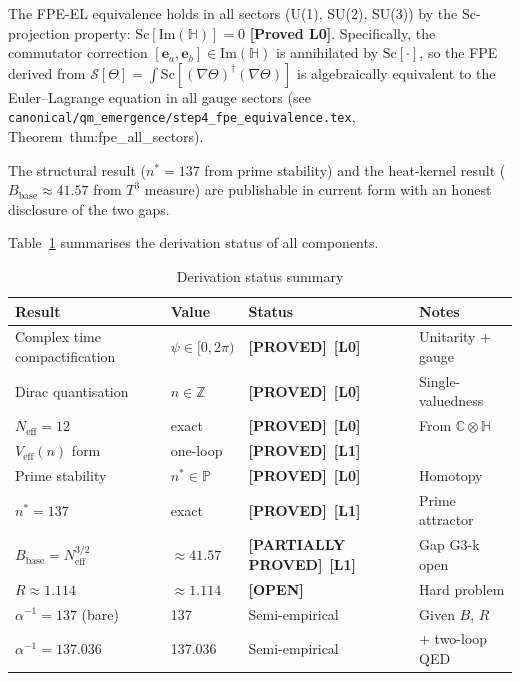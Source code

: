 \documentclass[11pt,a4paper]{article}
\theoremstyle{definition}
\theoremstyle{remark}
\newcommand{\Lzero}{\textbf{[L0]}}
\newcommand{\Lone}{\textbf{[L1]}}
\newcommand{\OPEN}{\textbf{[OPEN]}}
\newcommand{\PROVED}{\textbf{[PROVED]}}
\newcommand{\PARTIAL}{\textbf{[PARTIALLY PROVED]}}
\begin{document}
The FPE-EL equivalence holds in all sectors (U(1), SU(2), SU(3))
by the $\mathrm{Sc}$-projection property: $\mathrm{Sc}[\mathrm{Im}(\mathbb{H})] = 0$
\textbf{[Proved L0]}.  Specifically, the commutator correction
$[\mathbf{e}_a,\mathbf{e}_b] \in \mathrm{Im}(\mathbb{H})$ is annihilated by
$\mathrm{Sc}[\cdot]$, so the FPE derived from
$\mathcal{S}[\Theta] = \int\mathrm{Sc}[(\nabla\Theta)^\dagger(\nabla\Theta)]$
is algebraically equivalent to the Euler--Lagrange equation in all gauge sectors
(see \texttt{canonical/qm\_emergence/step4\_fpe\_equivalence.tex},
Theorem~thm:fpe\_all\_sectors).

The structural result ($n^* = 137$ from prime stability) and the heat-kernel
result ($B_{\mathrm{base}} \approx 41.57$ from $T^3$ measure) are publishable
in current form with an honest disclosure of the two gaps.

Table~\ref{tab:status} summarises the derivation status of all components.

\begin{table}[h]
\centering
\caption{Derivation status summary}
\label{tab:status}
\begin{tabular}{llll}
\toprule
Result & Value & Status & Notes \\
\midrule
Complex time compactification & $\psi \in [0,2\pi)$ & \PROVED\ \Lzero & Unitarity + gauge \\
Dirac quantisation & $n \in \mathbb{Z}$ & \PROVED\ \Lzero & Single-valuedness \\
$N_{\mathrm{eff}} = 12$ & exact & \PROVED\ \Lzero & From $\mathbb{C}\otimes\mathbb{H}$ \\
$V_{\mathrm{eff}}(n)$ form & one-loop & \PROVED\ \Lone & \\
Prime stability & $n^* \in \mathbb{P}$ & \PROVED\ \Lzero & Homotopy \\
$n^* = 137$ & exact & \PROVED\ \Lone & Prime attractor \\
$B_{\mathrm{base}} = N_{\mathrm{eff}}^{3/2}$ & $\approx 41.57$ & \PARTIAL\ \Lone & Gap G3-k open \\
$R \approx 1.114$ & $\approx 1.114$ & \OPEN & Hard problem \\
$\alpha^{-1} = 137$ (bare) & 137 & Semi-empirical & Given $B$, $R$ \\
$\alpha^{-1} = 137.036$ & 137.036 & Semi-empirical & + two-loop QED \\
\bottomrule
\end{tabular}
\end{table}


\end{document}
